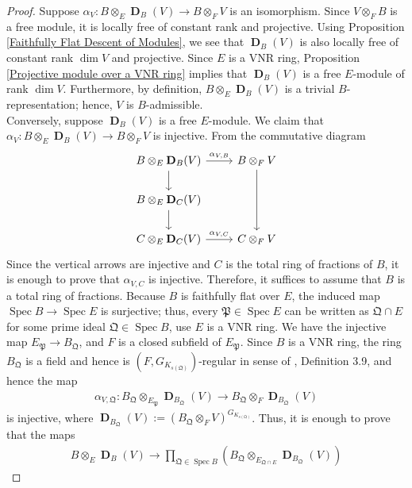 \documentclass{amsart}
\DeclareMathOperator{\spec}{Spec}
\DeclareMathOperator{\bD}{\textbf{D}}
\begin{document}
\begin{proof}
    Suppose $\alpha_V: B\otimes_E\bD_B(V)\to B\otimes_F V$ is an isomorphism. Since $V\otimes_FB$ is a free module, it is locally free of constant rank and projective. Using Proposition \ref{Faithfully Flat Descent of Modules}, we see that $\bD_B(V)$ is also locally free of constant rank $\dim V$ and projective. Since $E$ is a VNR ring, Proposition \ref{Projective module over a VNR ring} implies that $\bD_B(V)$ is a free $E$-module of rank $\dim V$. Furthermore, by definition, $B\otimes_E\bD_B(V)$ is a trivial $B$-representation; hence, $V$ is $B$-admissible. \\

    Conversely, suppose $\bD_B(V)$ is a free $E$-module. We claim that $\alpha_V:B\otimes_E\bD_B(V)\to B\otimes_F V$ is injective. From the commutative diagram
    \[
    \begin{tikzcd}
        B\otimes_E\bD_B(V)\arrow[r,"\alpha_{V,B}"]\arrow[d]& B\otimes_F V\arrow[dd]\\
        B\otimes_E\bD_C(V)                      \arrow[d]  &             \\
        C\otimes_E\bD_C(V)\arrow[r,"\alpha_{V,C}"]& C\otimes_F V
    \end{tikzcd}
    \]
    Since the vertical arrows are injective and $C$ is the total ring of fractions of $B$, it is enough to prove that $\alpha_{V,C}$ is injective. Therefore, it suffices to assume that $B$ is a total ring of fractions. Because $B$ is faithfully flat over $E$, the induced map $\spec B\to \spec E$ is surjective; thus, every $\mathfrak{P}\in\spec E$ can be written as $\mathfrak{Q}\cap E$ for some prime ideal $\mathfrak{Q}\in\spec B$, use $E$ is a VNR ring. We have the injective map $E_{\mathfrak{P}}\to B_{\mathfrak{Q}}$, and $F$ is a closed subfield of $E_{\mathfrak{P}}$. Since $B$ is a VNR ring, the ring $B_{\mathfrak{Q}}$ is a field and hence is $(F,G_{K_{s(\mathfrak{Q})}})$-regular in sense of \cite{Fontaine}, Definition 3.9, and hence the map
    \begin{align*}
        \alpha_{V,\mathfrak{Q}}: B_{\mathfrak{Q}}\otimes_{E_{\mathfrak{P}}}\bD_{B_{\mathfrak{Q}}}(V)\to B_{\mathfrak{Q}}\otimes_F\bD_{B_{\mathfrak{Q}}}(V)
    \end{align*}
    is injective, where $\bD_{B_{\mathfrak{Q}}}(V):=(B_{\mathfrak{Q}}\otimes_F V)^{G_{K_{s(\mathfrak{Q})}}}$. Thus, it is enough to prove that the maps
    \begin{align*}
        B\otimes_E\bD_B(V)\to\prod\limits_{\mathfrak{Q}\in\spec B}(B_{\mathfrak{Q}}\otimes_{E_{\mathfrak{Q}\cap E}}\bD_{B_{\mathfrak{Q}}}(V))

\end{align*}
\end{proof}
\end{document}
